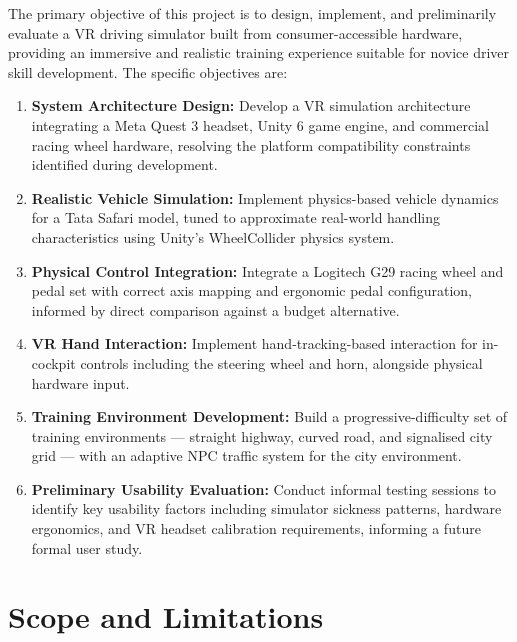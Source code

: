 The primary objective of this project is to design, implement, and preliminarily evaluate a VR driving simulator built from consumer-accessible hardware, providing an immersive and realistic training experience suitable for novice driver skill development. The specific objectives are:

\begin{enumerate}
    \item \textbf{System Architecture Design:} Develop a VR simulation architecture integrating a Meta Quest 3 headset, Unity 6 game engine, and commercial racing wheel hardware, resolving the platform compatibility constraints identified during development.
    
    \item \textbf{Realistic Vehicle Simulation:} Implement physics-based vehicle dynamics for a Tata Safari model, tuned to approximate real-world handling characteristics using Unity's WheelCollider physics system.
    
    \item \textbf{Physical Control Integration:} Integrate a Logitech G29 racing wheel and pedal set with correct axis mapping and ergonomic pedal configuration, informed by direct comparison against a budget alternative.
    
    \item \textbf{VR Hand Interaction:} Implement hand-tracking-based interaction for in-cockpit controls including the steering wheel and horn, alongside physical hardware input.
    
    \item \textbf{Training Environment Development:} Build a progressive-difficulty set of training environments — straight highway, curved road, and signalised city grid — with an adaptive NPC traffic system for the city environment.
    
    \item \textbf{Preliminary Usability Evaluation:} Conduct informal testing sessions to identify key usability factors including simulator sickness patterns, hardware ergonomics, and VR headset calibration requirements, informing a future formal user study.
\end{enumerate}

\section{Scope and Limitations}

